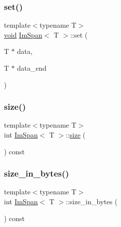 \mbox{\label{structImSpan_aa663983a692baf82e44687cc9a373964}} 
\subsubsection{\texorpdfstring{set()}{set()}\hspace{0.1cm}{\footnotesize\ttfamily [2/2]}}
{\footnotesize\ttfamily template$<$typename T$>$ \\
\hyperlink{imgui__impl__opengl3__loader_8h_ac668e7cffd9e2e9cfee428b9b2f34fa7}{void} \hyperlink{structImSpan}{Im\+Span}$<$ T $>$\+::set (\begin{DoxyParamCaption}\item[{T $\ast$}]{data,  }\item[{T $\ast$}]{data\+\_\+end }\end{DoxyParamCaption})\hspace{0.3cm}{\ttfamily [inline]}}

\mbox{\label{structImSpan_a88270b885861b27640003f6a8a3effa0}} 
\subsubsection{\texorpdfstring{size()}{size()}}
{\footnotesize\ttfamily template$<$typename T$>$ \\
int \hyperlink{structImSpan}{Im\+Span}$<$ T $>$\+::\hyperlink{imgui__impl__opengl3__loader_8h_a3d1e3edfcf61ca2d831883e1afbad89e}{size} (\begin{DoxyParamCaption}{ }\end{DoxyParamCaption}) const\hspace{0.3cm}{\ttfamily [inline]}}

\mbox{\label{structImSpan_a23a632e44927fde363df6191531591f2}} 
\subsubsection{\texorpdfstring{size\+\_\+in\+\_\+bytes()}{size\_in\_bytes()}}
{\footnotesize\ttfamily template$<$typename T$>$ \\
int \hyperlink{structImSpan}{Im\+Span}$<$ T $>$\+::size\+\_\+in\+\_\+bytes (\begin{DoxyParamCaption}{ }\end{DoxyParamCaption}) const\hspace{0.3cm}{\ttfamily [inline]}}



